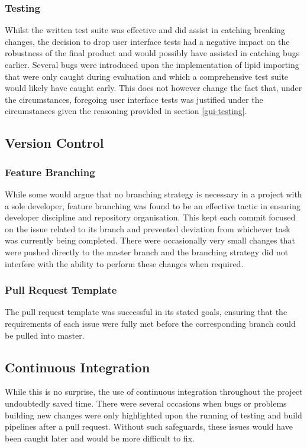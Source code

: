 \documentclass{l4proj}
\begin{document}
\subsubsection{Testing}
Whilst the written test suite was effective and did assist in catching breaking changes, the decision to drop user interface tests had a negative impact on the robustness of the final product and would possibly have assisted in catching bugs earlier. Several bugs were introduced upon the implementation of lipid importing that were only caught during evaluation and which a comprehensive test suite would likely have caught early. This does not however change the fact that, under the circumstances, foregoing user interface tests was justified under the circumstances given the reasoning provided in section \ref{gui-testing}.

\subsection{Version Control}
\subsubsection{Feature Branching}
While some would argue that no branching strategy is necessary in a project with a sole developer, feature branching was found to be an effective tactic in ensuring developer discipline and repository organisation. This kept each commit focused on the issue related to its branch and prevented deviation from whichever task was currently being completed. There were occasionally very small changes that were pushed directly to the master branch and the branching strategy did not interfere with the ability to perform these changes when required.

\subsubsection{Pull Request Template}
The pull request template was successful in its stated goals, ensuring that the requirements of each issue were fully met before the corresponding branch could be pulled into master.

\subsection{Continuous Integration}
While this is no surprise, the use of continuous integration throughout the project undoubtedly saved time. There were several occasions when bugs or problems building new changes were only highlighted upon the running of testing and build pipelines after a pull request. Without such safeguards, these issues would have been caught later and would be more difficult to fix.
\end{document}
